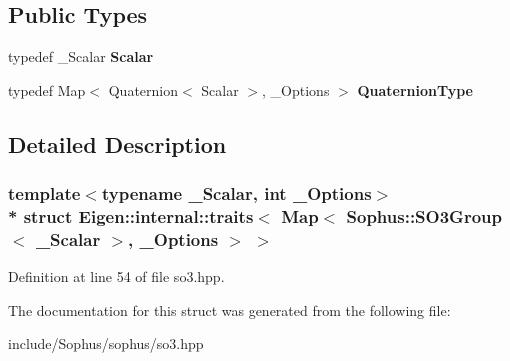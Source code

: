 \subsection*{Public Types}
\begin{DoxyCompactItemize}
\item 
typedef \+\_\+\+Scalar {\bfseries Scalar}\hypertarget{struct_eigen_1_1internal_1_1traits_3_01_map_3_01_sophus_1_1_s_o3_group_3_01___scalar_01_4_00_01___options_01_4_01_4_a28eff2bf15b05221714925b13d0a1ad4}{}\label{struct_eigen_1_1internal_1_1traits_3_01_map_3_01_sophus_1_1_s_o3_group_3_01___scalar_01_4_00_01___options_01_4_01_4_a28eff2bf15b05221714925b13d0a1ad4}

\item 
typedef Map$<$ Quaternion$<$ Scalar $>$, \+\_\+\+Options $>$ {\bfseries Quaternion\+Type}\hypertarget{struct_eigen_1_1internal_1_1traits_3_01_map_3_01_sophus_1_1_s_o3_group_3_01___scalar_01_4_00_01___options_01_4_01_4_a1045cb02afb45f2c092a98d65bbee511}{}\label{struct_eigen_1_1internal_1_1traits_3_01_map_3_01_sophus_1_1_s_o3_group_3_01___scalar_01_4_00_01___options_01_4_01_4_a1045cb02afb45f2c092a98d65bbee511}

\end{DoxyCompactItemize}


\subsection{Detailed Description}
\subsubsection*{template$<$typename \+\_\+\+Scalar, int \+\_\+\+Options$>$\\*
struct Eigen\+::internal\+::traits$<$ Map$<$ Sophus\+::\+S\+O3\+Group$<$ \+\_\+\+Scalar $>$, \+\_\+\+Options $>$ $>$}



Definition at line 54 of file so3.\+hpp.



The documentation for this struct was generated from the following file\+:\begin{DoxyCompactItemize}
\item 
include/\+Sophus/sophus/so3.\+hpp\end{DoxyCompactItemize}
